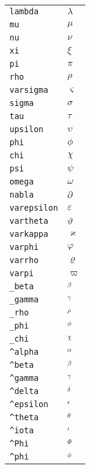 \begin{longtable}{ll}
\texttt{lambda}&${}\lambda {}$\\
\texttt{mu}&${}\mu {}$\\
\texttt{nu}&${}\nu {}$\\
\texttt{xi}&${}\xi {}$\\
\texttt{pi}&${}\pi {}$\\
\texttt{rho}&${}\rho {}$\\
\texttt{varsigma}&${}\varsigma {}$\\
\texttt{sigma}&${}\sigma {}$\\
\texttt{tau}&${}\tau {}$\\
\texttt{upsilon}&${}\upsilon {}$\\
\texttt{phi}&${}\phi {}$\\
\texttt{chi}&${}\chi {}$\\
\texttt{psi}&${}\psi {}$\\
\texttt{omega}&${}\omega {}$\\
\texttt{nabla}&${}\partial {}$\\
\texttt{varepsilon}&${}\varepsilon {}$\\
\texttt{vartheta}&${}\vartheta {}$\\
\texttt{varkappa}&${}\varkappa {}$\\
\texttt{varphi}&${}\varphi {}$\\
\texttt{varrho}&${}\varrho {}$\\
\texttt{varpi}&${}\varpi {}$\\
\texttt{\_beta}&${}_\beta {}$\\
\texttt{\_gamma}&${}_\gamma {}$\\
\texttt{\_rho}&${}_\rho {}$\\
\texttt{\_phi}&${}_\phi {}$\\
\texttt{\_chi}&${}_\chi {}$\\
\texttt{\textasciicircum alpha}&${}^\alpha {}$\\
\texttt{\textasciicircum beta}&${}^\beta {}$\\
\texttt{\textasciicircum gamma}&${}^\gamma {}$\\
\texttt{\textasciicircum delta}&${}^\delta {}$\\
\texttt{\textasciicircum epsilon}&${}^\epsilon {}$\\
\texttt{\textasciicircum theta}&${}^\theta {}$\\
\texttt{\textasciicircum iota}&${}^\iota {}$\\
\texttt{\textasciicircum Phi}&${}^\Phi {}$\\
\texttt{\textasciicircum phi}&${}^\phi {}$\\

\end{longtable}
